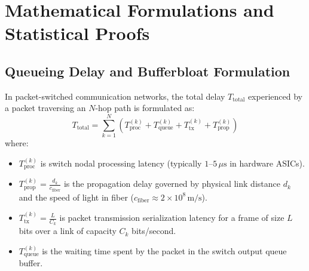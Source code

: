 \chapter{Mathematical Formulations and Statistical Proofs}
\label{app:math}

\section{Queueing Delay and Bufferbloat Formulation}
In packet-switched communication networks, the total delay $T_{\text{total}}$ experienced by a packet traversing an $N$-hop path is formulated as:
\begin{equation}
  T_{\text{total}} = \sum_{k=1}^N \left( T_{\text{proc}}^{(k)} + T_{\text{queue}}^{(k)} + T_{\text{tx}}^{(k)} + T_{\text{prop}}^{(k)} \right)
\end{equation}
where:
\begin{itemize}
  \item $T_{\text{proc}}^{(k)}$ is switch nodal processing latency (typically $1\text{--}5\,\mu\text{s}$ in hardware ASICs).
  \item $T_{\text{prop}}^{(k)} = \frac{d_k}{c_{\text{fiber}}}$ is the propagation delay governed by physical link distance $d_k$ and the speed of light in fiber ($c_{\text{fiber}} \approx 2 \times 10^8\,\text{m/s}$).
  \item $T_{\text{tx}}^{(k)} = \frac{L}{C_k}$ is packet transmission serialization latency for a frame of size $L$ bits over a link of capacity $C_k$ bits/second.
  \item $T_{\text{queue}}^{(k)}$ is the waiting time spent by the packet in the switch output queue buffer.
\end{itemize}

